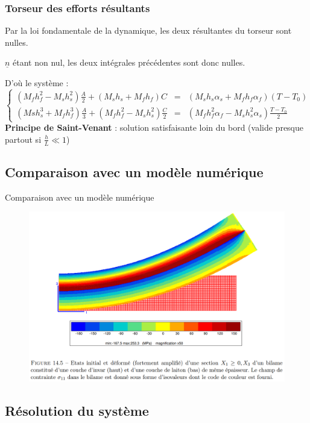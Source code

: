 \begin{frame}
    \frametitle{Torseur des efforts résultants}
    Par la loi fondamentale de la dynamique, les deux résultantes du torseur sont nulles.
    
    $\underline{n}$ étant non nul, les deux intégrales précédentes sont donc nulles.
    
    D'où le système :
    $$
    \left \{
    \begin{array}{rcl}
    (M_fh_f^{2}-M_sh_s^{2})\frac{A}{2}+(M_sh_s+M_fh_f)C&=&(M_sh_s\alpha_s+M_fh_f\alpha_f)(T-T_0) \\
    (Msh_s^{3}+M_fh_f^{3})\frac{A}{3}+(M_fh_f^{2}-M_sh_s^{2})\frac{C}{2}&=&(M_fh_f^{2}\alpha_f-M_sh_s^{2}\alpha_s)\frac{T-T_0}{2}
    \end{array}
    \right.
    $$
    \textbf{Principe de Saint-Venant} : solution satisfaisante loin du bord (valide presque partout si $\frac{h}{L}\ll1$)
\end{frame}

\subsection{Comparaison avec un modèle numérique}

\begin{frame}{Comparaison avec un modèle numérique}
    \begin{figure}
        \centering
        \includegraphics[scale=0.5]{imgs/simul_num.png}
    \end{figure}
\end{frame}

\subsection{Résolution du système}


